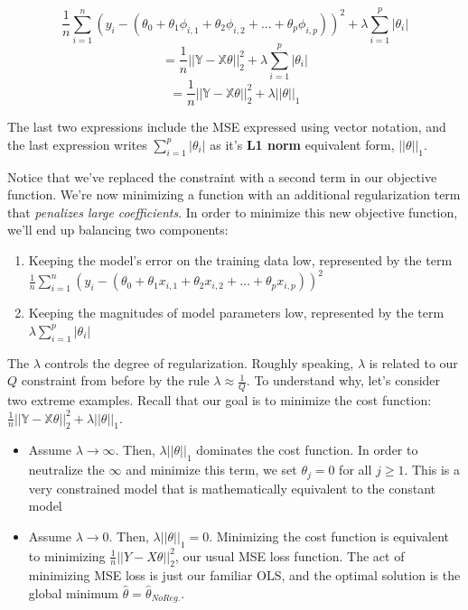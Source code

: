 \documentclass[
  letterpaper,
  DIV=11,
  numbers=noendperiod]{scrreprt}
\providecommand{\tightlist}{%
  \setlength{\itemsep}{0pt}\setlength{\parskip}{0pt}}\usepackage{longtable,booktabs,array}
\begin{document}
\[\frac{1}{n} \sum_{i=1}^n (y_i - (\theta_0 + \theta_1 \phi_{i, 1} + \theta_2 \phi_{i, 2} + \ldots + \theta_p \phi_{i, p}))^2 + \lambda \sum_{i=1}^p \vert \theta_i \vert\]
\[ = \frac{1}{n}||\mathbb{Y} - \mathbb{X}\theta||_2^2 + \lambda \sum_{i=1}^p |\theta_i|\]
\[ = \frac{1}{n}||\mathbb{Y} - \mathbb{X}\theta||_2^2 + \lambda || \theta ||_1\]

The last two expressions include the MSE expressed using vector
notation, and the last expression writes \(\sum_{i=1}^p |\theta_i|\) as
it's \textbf{L1 norm} equivalent form, \(|| \theta ||_1\).

Notice that we've replaced the constraint with a second term in our
objective function. We're now minimizing a function with an additional
regularization term that \emph{penalizes large coefficients}. In order
to minimize this new objective function, we'll end up balancing two
components:

\begin{enumerate}
\def\labelenumi{\arabic{enumi}.}
\tightlist
\item
  Keeping the model's error on the training data low, represented by the
  term
  \(\frac{1}{n} \sum_{i=1}^n (y_i - (\theta_0 + \theta_1 x_{i, 1} + \theta_2 x_{i, 2} + \ldots + \theta_p x_{i, p}))^2\)
\item
  Keeping the magnitudes of model parameters low, represented by the
  term \(\lambda \sum_{i=1}^p |\theta_i|\)
\end{enumerate}

The \(\lambda\) controls the degree of regularization. Roughly speaking,
\(\lambda\) is related to our \(Q\) constraint from before by the rule
\(\lambda \approx \frac{1}{Q}\). To understand why, let's consider two
extreme examples. Recall that our goal is to minimize the cost function:
\(\frac{1}{n}||\mathbb{Y} - \mathbb{X}\theta||_2^2 + \lambda || \theta ||_1\).

\begin{itemize}
\item
  Assume \(\lambda \rightarrow \infty\). Then,
  \(\lambda || \theta ||_1\) dominates the cost function. In order to
  neutralize the \(\infty\) and minimize this term, we set
  \(\theta_j = 0\) for all \(j \ge 1\). This is a very constrained model
  that is mathematically equivalent to the constant model
\item
  Assume \(\lambda \rightarrow 0\). Then, \(\lambda || \theta ||_1=0\).
  Minimizing the cost function is equivalent to minimizing
  \(\frac{1}{n} || Y - X\theta ||_2^2\), our usual MSE loss function.
  The act of minimizing MSE loss is just our familiar OLS, and the
  optimal solution is the global minimum
  \(\hat{\theta} = \hat\theta_{No Reg.}\).
\end{itemize}
\end{document}
